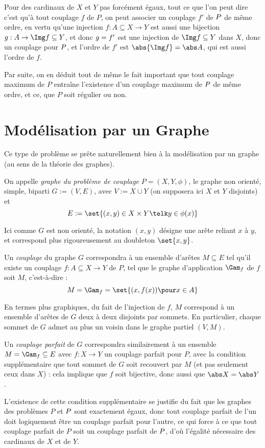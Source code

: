  Pour des cardinaux de $X$ et $Y$ pas forcément égaux, tout ce que l'on peut dire c'est qu'à tout couplage $f$ de $P$, on peut associer un couplage $f'$ de $P\-$ de même ordre, en vertu qu'une injection $f : A \subseteq X \to Y$ est aussi une bijection $g : A \to \Img f \subseteq Y$, et donc $g\- = f'$ est une injection de $\Img f \subseteq Y$ dans $X$, donc un couplage pour $P\-$, et l'ordre de $f'$ est $\abs{\Img f} = \abs A$, qui est aussi l'ordre de $f$.
 
 Par suite, on en déduit tout de même le fait important que tout couplage maximum de $P$ entraîne l'existence d'un couplage maximum de $P\-$ de même ordre, et ce, que $P$ soit régulier ou non.
 
 \section{Modélisation par un Graphe}
 
 Ce type de problème se prête naturellement bien à la modélisation par un graphe (au sens de la théorie des graphes).
 
 \SEP\jdefi On appelle \emph{graphe du problème de couplage} $P = (X,Y,\phi)$, le graphe non orienté, simple, biparti $G := (V, E)$, avec $V := X \cup Y$ (on supposera ici $X$ et $Y$ disjoints) et
 \[ E := \set{ (x,y) \in X \times Y \telk y \in \phi(x) }\]
 
 Ici comme $G$ est non orienté, la notation $(x,y)$ désigne une arête reliant $x$ à $y$, et correspond plus rigoureusement au doubleton $\set{x,y}$.
 
 Un \emph{couplage} du graphe $G$ correspondra à un ensemble d'arêtes $M \subseteq E$ tel qu'il existe un couplage $f : A \subseteq X \to Y$ de $P$, tel que le graphe d'application $\Gam_f$ de $f$ soit $M$, c'est-à-dire :
 \[ M = \Gam_f = \set{ (x,f(x)) \pour x \in A } \]
 
 En termes plus graphiques, du fait de l'injection de $f$, $M$ correspond à un ensemble d'arêtes de $G$ deux à deux disjoints par sommets. En particulier, chaque sommet de $G$ admet au plus un voisin dans le graphe partiel $(V, M)$.
 
 Un \emph{couplage parfait} de $G$ correspondra similairement à un ensemble $M = \Gam_f \subseteq E$ avec $f : X \to Y$ un couplage parfait pour $P$, avec la condition supplémentaire que tout sommet de $G$ soit recouvert par $M$ (et pas seulement ceux dans $X$) : cela implique que $f$ soit bijective, donc aussi que $\abs X = \abs Y$.
 
 L'existence de cette condition supplémentaire se justifie du fait que les graphes des problèmes $P$ et $P\-$ sont exactement égaux, donc tout couplage parfait de l'un doit logiquement être un couplage parfait pour l'autre, ce qui force à ce que tout couplage parfait de $P$ soit un couplage parfait de $P\-$, d'où l'égalité nécessaire des cardinaux de $X$ et de $Y$.
 

